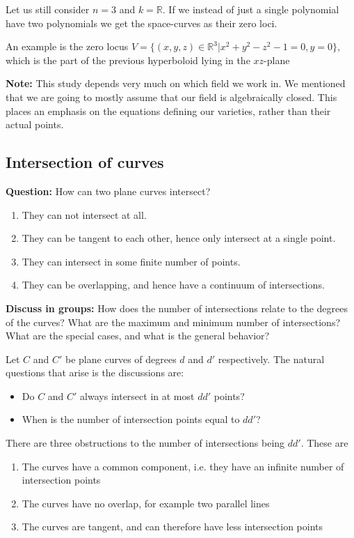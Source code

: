 Let us still consider $n=3$ and $k=\mathbb{R}$. If we instead of just a single polynomial have two polynomials we get the space-curves as their zero loci. 

\begin{example}
An example is the zero locus $V=\{(x,y,z)\in \mathbb{R}^3 \vert x^2+y^2-z^2-1 = 0, y=0\}$, which is the part of the previous hyperboloid lying in the $xz$-plane
\end{example}

\textbf{Note: } This study depends very much on which field we work in. We mentioned that we are going to mostly assume that our field is algebraically closed. This places an emphasis on the equations defining our varieties, rather than their actual points. 

\subsection{Intersection of curves}
\textbf{Question:} How can two plane curves intersect?

\begin{enumerate}
    \item They can not intersect at all. 
    \item They can be tangent to each other, hence only intersect at a single point. 
    \item They can intersect in some finite number of points.
    \item They can be overlapping, and hence have a continuum of intersections.
\end{enumerate}

\textbf{Discuss in groups:} How does the number of intersections relate to the degrees of the curves? What are the maximum and minimum number of intersections? What are the special cases, and what is the general behavior?

Let $C$ and $C'$ be plane curves of degrees $d$ and $d'$  respectively. The natural questions that arise is the discussions are:

\begin{itemize}
    \item Do $C$ and $C'$ always intersect in at most $dd'$ points?
    \item When is the number of intersection points equal to $dd'$?
\end{itemize}

There are three obstructions to the number of intersections being $dd'$. These are
\begin{enumerate}
    \item The curves have a common component, i.e. they have an infinite number of intersection points
    \item The curves have no overlap, for example two parallel lines
    \item The curves are tangent, and can therefore have less intersection points
\end{enumerate}

